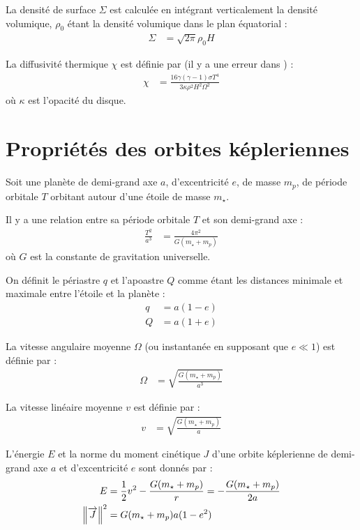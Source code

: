 La densité de surface $\Sigma$ est calculée en intégrant verticalement la densité volumique, $\rho_0$ étant la densité volumique dans le plan équatorial : 
\begin{align}
\Sigma &= \sqrt{2\pi}\rho_0 H
\end{align}

La diffusivité thermique $\chi$ est définie par (il y a une erreur dans \cite[eq. (33)]{paardekooper2011torque}) : 
\begin{align}
\chi &= \frac{16\gamma (\gamma - 1) \sigma T^4}{3\kappa\rho^2H^2\Omega^2}\label{eq:diffusivity}
\end{align}
où $\kappa$ est l'opacité du disque.

\section{Propriétés des orbites képleriennes}
Soit une planète de demi-grand axe $a$, d'excentricité $e$, de masse $m_p$, de période orbitale $T$ orbitant autour d'une étoile de masse $m_\star$. 

Il y a une relation entre sa période orbitale $T$ et son demi-grand axe :
\begin{align}
\frac{T^2}{a^3} &= \frac{4\pi^2}{G(m_\star + m_p)}
\end{align}
où $G$ est la constante de gravitation universelle.

On définit le périastre $q$ et l'apoastre $Q$ comme étant les distances minimale et maximale entre l'étoile et la planète : 
\begin{subequations}
\begin{align}
q &= a (1 - e)\\
Q &= a (1 + e)
\end{align}
\end{subequations}

La vitesse angulaire moyenne $\Omega$ (ou instantanée en supposant que $e\ll 1$) est définie par : 
\begin{align}
\Omega &= \sqrt{\frac{G(m_\star + m_p)}{a^3}}
\end{align}

La vitesse linéaire moyenne $v$ est définie par : 
\begin{align}
v &= \sqrt{\frac{G(m_\star + m_p)}{a}}
\end{align}

L'énergie $E$ et la norme du moment cinétique $J$ d'une orbite képlerienne de demi-grand axe $a$ et d'excentricité $e$ sont donnés par :
\begin{align}
E &= \frac{1}{2}v^2 - \frac{G(m_\star + m_p)}{r} = -\frac{G(m_\star + m_p)}{2a}\\
\left\|{\overrightarrow{J}}\right\|^2 &= G(m_\star + m_p) a (1-e^2)
\end{align}


